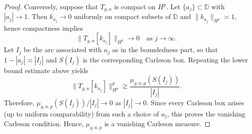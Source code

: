 \documentclass[preprint,12pt]{elsarticle}
\numberwithin{equation}{section}
\theoremstyle{remark}
\begin{document}
\begin{proof}
Conversely, suppose that $T_{g,n}$ is compact on $H^p$.
Let $\{a_j\}\subset \mathbb D$ with $|a_j|\to 1$. Then $k_{a_j}\to 0$ uniformly on compact subsets of $\mathbb D$
and $\|k_{a_j}\|_{H^p}\asymp 1$, hence compactness implies
\begin{equation*}
\|T_{g,n}[k_{a_j}]\|_{H^p}\longrightarrow 0 \quad \text{as }j\to\infty.
\end{equation*}
Let $I_j$ be the arc associated with $a_j$ as in the boundedness part, so that $1-|a_j|\asymp |I_j|$ and $S(I_j)$
is the corresponding Carleson box. Repeating the lower bound estimate above yields
\begin{equation*}
\|T_{g,n}[k_{a_j}]\|_{H^p}^p
\gtrsim \frac{\mu_{g,n,p}(S(I_j))}{|I_j|}.
\end{equation*}
Therefore, $\mu_{g,n,p}(S(I_j))/|I_j|\to 0$ as $|I_j|\to 0$. Since every Carleson box arises (up to uniform comparability) from such a choice of $a_j$, this proves the vanishing Carleson condition. Hence, $\mu_{g,n,p}$ is a vanishing Carleson measure.
\end{proof}

\end{document}
